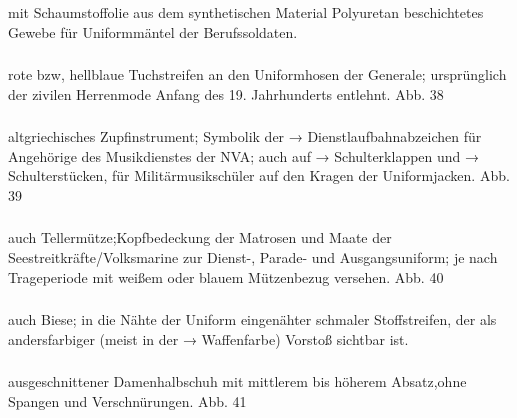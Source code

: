 \subsubsection*{}%

mit Schaumstoffolie aus dem synthetischen Material Polyuretan beschichtetes Gewebe für Uniformmäntel der Berufssoldaten.

\subsubsection*{}%

rote bzw, hellblaue Tuchstreifen an den Uniformhosen der Generale; ursprünglich der zivilen Herrenmode Anfang des 19. Jahrhunderts entlehnt. Abb. 38

\subsubsection*{}%

altgriechisches Zupfinstrument; Symbolik der → Dienstlaufbahnabzeichen für Angehörige des Musikdienstes der NVA; auch auf → Schulterklappen und → Schulterstücken, für Militärmusikschüler auf den Kragen der Uniformjacken. Abb. 39

\subsubsection*{}%

auch Tellermütze;Kopfbedeckung der Matrosen und Maate der Seestreitkräfte/Volksmarine zur Dienst-, Parade- und Ausgangsuniform; je nach Trageperiode mit weißem oder blauem Mützenbezug versehen. Abb. 40

\subsubsection*{}%

auch Biese; in die Nähte der Uniform eingenähter schmaler Stoffstreifen, der als andersfarbiger (meist in der → Waffenfarbe) Vorstoß sichtbar ist.

\subsubsection*{}%

ausgeschnittener Damenhalbschuh mit mittlerem bis höherem Absatz,ohne Spangen und Verschnürungen. Abb. 41

\subsubsection*{}%

